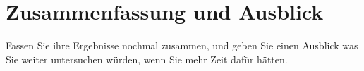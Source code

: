 \chapter{Zusammenfassung und Ausblick}

Fassen Sie ihre Ergebnisse nochmal zusammen, und geben Sie einen Ausblick was
Sie weiter untersuchen würden, wenn Sie mehr Zeit dafür hätten.
